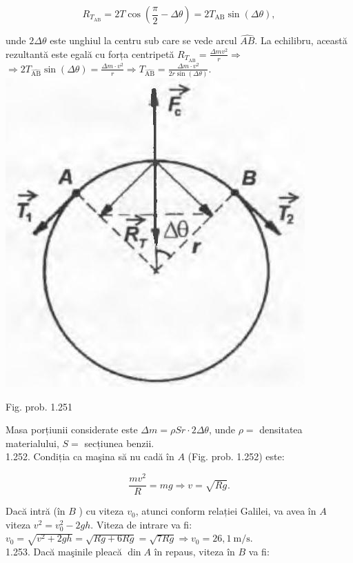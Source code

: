 \documentclass[10pt]{article}
\begin{document}
$$
R_{T_{\mathrm{AB}}}=2 T \cos \left(\frac{\pi}{2}-\Delta \theta\right)=2 T_{\mathrm{AB}} \sin (\Delta \theta),
$$

unde $2 \Delta \theta$ este unghiul la centru sub care se vede arcul $\hat{A B}$. La echilibru, această rezultantă este egală cu forța centripetă $R_{T_{\mathrm{AB}}}=\frac{\Delta m v^{2}}{r} \Rightarrow$\\
$\Rightarrow 2 T_{\hat{\mathrm{AB}}} \sin (\Delta \theta)=\frac{\Delta m \cdot v^{2}}{r} \Rightarrow T_{\hat{\mathrm{AB}}}=\frac{\Delta m \cdot v^{2}}{2 r \sin (\Delta \theta)}$.\\
\includegraphics[max width=\textwidth, center]{2025_07_01_5b3ff9fa0d508c8e9f17g-251}

Fig. prob. 1.251

Masa porțiunii considerate este $\Delta m=\rho S r \cdot 2 \Delta \theta$, unde $\rho=$ densitatea materialului, $S=$ secțiunea benzii.\\
1.252. Condiția ca maşina să nu cadă în $A$ (Fig. prob. 1.252) este:

$$
\frac{m v^{2}}{R}=m g \Rightarrow v=\sqrt{R g} .
$$

Dacă intră (în $B$ ) cu viteza $v_{0}$, atunci conform relației Galilei, va avea în $A$ viteza $v^{2}=v_{0}^{2}-2 g h$. Viteza de intrare va fi:\\
$v_{0}=\sqrt{v^{2}+2 g h}=\sqrt{R g+6 R g}=\sqrt{7 R g} \Rightarrow v_{0}=26,1 \mathrm{~m} / \mathrm{s}$.\\
1.253. Dacă maşinile pleacă $\operatorname{din} A$ în repaus, viteza în $B$ va fi:
\end{document}
